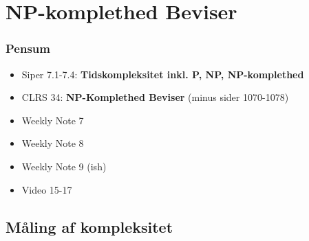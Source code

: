 \section{NP-komplethed Beviser}%
\label{sec:npkomplethed}

\begin{frame}
	\frametitle{Pensum}
	\begin{itemize}
		\item Siper 7.1-7.4: \textbf{Tidskompleksitet inkl. P, NP, NP-komplethed}
		\item CLRS 34: \textbf{NP-Komplethed Beviser} (minus sider 1070-1078)
		\item Weekly Note 7
		\item Weekly Note 8
		\item Weekly Note 9 (ish)
		\item Video 15-17
	\end{itemize}
\end{frame}

\subsection{Måling af kompleksitet}%
\label{subsec:label}

